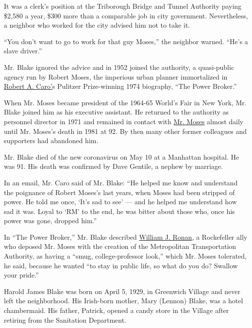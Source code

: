 It was a clerk's position at the Triborough Bridge and Tunnel Authority
paying \$2,580 a year, \$300 more than a comparable job in city
government. Nevertheless, a neighbor who worked for the city advised him
not to take it.

``You don't want to go to work for that guy Moses,'' the neighbor
warned. ``He's a slave driver.''

Mr. Blake ignored the advice and in 1952 joined the authority, a
quasi-public agency run by Robert Moses, the imperious urban planner
immortalized in
\href{https://www.nytimes3xbfgragh.onion/interactive/2019/04/01/magazine/robert-caro-working-memoir.html}{Robert
A. Caro'}s Pulitzer Prize-winning 1974 biography, ``The Power Broker.''

When Mr. Moses became president of the 1964-65 World's Fair in New York,
Mr. Blake joined him as his executive assistant. He returned to the
authority as personnel director in 1971 and remained in contact with
\href{https://www.nytimes3xbfgragh.onion/1981/07/30/obituaries/robert-moses-master-builder-is-dead-at-92.html}{Mr.
Moses} almost daily until Mr. Moses's death in 1981 at 92. By then many
other former colleagues and supporters had abandoned him.

Mr. Blake died of the new coronavirus on May 10 at a Manhattan hospital.
He was 91. His death was confirmed by Dave Gentile, a nephew by
marriage.

In an email, Mr. Caro said of Mr. Blake: ``He helped me know and
understand the poignance of Robert Moses's last years, when Moses had
been stripped of power. He told me once, `It's sad to see' --- and he
helped me understand how sad it was. Loyal to `RM' to the end, he was
bitter about those who, once his power was gone, dropped him.''

In ``The Power Broker,'' Mr. Blake described
\href{https://www.nytimes3xbfgragh.onion/2014/10/18/nyregion/william-j-ronan-architect-of-the-metropolitan-transportation-authority-dies-at-101.html}{William
J. Ronan}, a Rockefeller ally who deposed Mr. Moses with the creation of
the Metropolitan Transportation Authority, as having a ``smug,
college-professor look,'' which Mr. Moses tolerated, he said, because he
wanted ``to stay in public life, so what do you do? Swallow your
pride.''

Harold James Blake was born on April 5, 1929, in Greenwich Village and
never left the neighborhood. His Irish-born mother, Mary (Lennon) Blake,
was a hotel chambermaid. His father, Patrick, opened a candy store in
the Village after retiring from the Sanitation Department.


